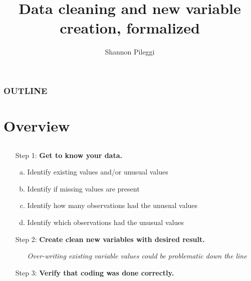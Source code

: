 



\title[Lecture 9]{Data cleaning and new variable creation, formalized}
\author[Pileggi]{Shannon Pileggi}


\date{}




\begin{frame}
\titlepage
\end{frame}

\begin{frame}
\frametitle{OUTLINE\qquad\qquad\qquad} \tableofcontents[hideallsubsections]
\end{frame}



\section[Overview]{Overview}
\subsection{}

\begin{frame}
\hspace*{0.3cm}
\begin{itemize}
\item[Step 1:] \textbf{Get to know your data.}
\begin{enumerate}[a.]
\item Identify existing values and/or unusual values
\item Identify if missing values are present
\item Identify how many observations had the unusual values
\item Identify which observations had the unusual values
\end{enumerate}
\item[]
\item[Step 2:] \textbf{Create clean new variables with desired result.}
\begin{enumerate}
\item[] \emph{Over-writing existing variable values could be problematic down the line}
\end{enumerate}
\item[]
\item[Step 3:] \textbf{Verify that coding was done correctly.}
\item[]
\end{itemize}
\end{frame}


